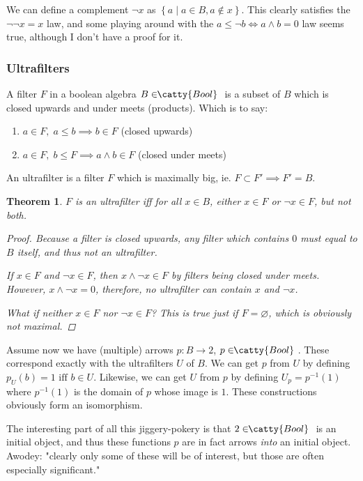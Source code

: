 \documentclass[]{article}
\newtheorem{theorem}{Theorem}
\newcommand{\setn}[1]{\left\{#1\right\}}
\newcommand{\tfarr}[4][\to]{\ensuremath{#2 : #3 #1 #4}}
\newcommand{\cat}[1]{\ensuremath{\!\! \catty{#1} \,\,}}
\begin{document}
We can define a complement $\neg x$ as $\setn{a\;|\;a \in B, a \not \in x}$.
This clearly satisfies the $\neg \neg x = x$ law, and some playing around with
the $a \leq \neg b \iff a \wedge b = 0$ law seems true, although I don't have a
proof for it.

\subsubsection{Ultrafilters}

A filter $F$ in a boolean algebra $B \in \cat{Bool}$ is a subset of $B$ which is
closed upwards and under meets (products). Which is to say:

\begin{enumerate}
  \item{$a \in F,\; a \leq b \implies b \in F$ (closed upwards)}
  \item{$a \in F,\; b \leq F \implies a \wedge b \in F$ (closed under meets)}
\end{enumerate}

An ultrafilter is a filter $F$ which is maximally big, ie. $F \subset F'
\implies F' = B$.

\begin{theorem}
  $F$ is an ultrafilter iff for all $x \in B$, either $x \in F$ or $\neg x \in
  F$, but not both.
  \begin{proof}
    Because a filter is closed upwards, any filter which contains $0$ must equal
    to $B$ itself, and thus not an ultrafilter.

    If $x \in F$ and $\neg x \in F$, then $x \wedge \neg x \in F$ by filters
    being closed under meets. However, $x \wedge \neg x = 0$, therefore, no
    ultrafilter can contain $x$ and $\neg x$.

    What if neither $x \in F$ nor $\neg x \in F$? This is true just if $F =
    \varnothing$, which is obviously not maximal.
  \end{proof}
\end{theorem}

Assume now we have (multiple) arrows \tfarr{p}{B}{2}, $p \in \cat{Bool}$. These
correspond exactly with the ultrafilters $U$ of $B$. We can get $p$ from $U$ by
defining $p_U(b) = 1 \text{ iff } b \in U$. Likewise, we can get $U$ from $p$ by
defining $U_p = p^{-1}(1)$ where $p^{-1}(1)$ is the domain of $p$ whose image is
$1$. These constructions obviously form an isomorphism.

The interesting part of all this jiggery-pokery is that $2 \in \cat{Bool}$ is an
initial object, and thus these functions $p$ are in fact arrows \textit{into} an
initial object. Awodey: "clearly only some of these will be of interest, but
those are often especially significant."
\end{document}

